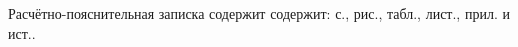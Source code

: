 Расчётно-пояснительная записка содержит содержит: \pageref{bib:end} с.,  рис.,  табл.,  лист.,  прил. и  ист..